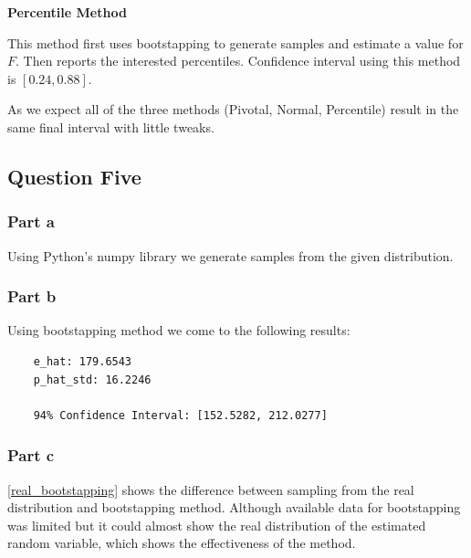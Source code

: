 \documentclass[12pt, a4paper]{book}
\begin{document}
\textbf{Percentile Method}

This method first uses bootstapping to generate samples and estimate a value for $F$. Then reports the
interested percentiles. Confidence interval using this method is $[0.24, 0.88]$.

As we expect all of the three methods (Pivotal, Normal, Percentile) result in the same final interval with little tweaks.

\subsection*{Question Five}

\subsubsection*{Part a}

Using Python's numpy library we generate samples from the given distribution.

\subsubsection*{Part b}

Using bootstapping method we come to the following results:

\begin{mdframed}
    \begin{verbatim}
    e_hat: 179.6543
    p_hat_std: 16.2246

    94% Confidence Interval: [152.5282, 212.0277]
    \end{verbatim}
\end{mdframed}

\subsubsection*{Part c}

\autoref{real_bootstapping} shows the difference between sampling from the real distribution and
bootstapping method. Although available data for bootstapping was limited but it could almost show
the real distribution of the estimated random variable, which shows the effectiveness of the
method.
\end{document}
